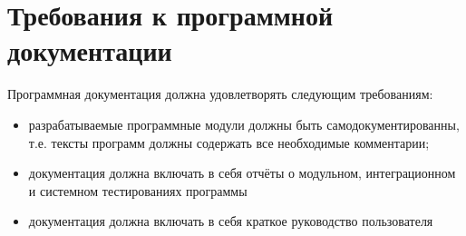 \documentclass[a4paper,12pt]{report}
\numberwithin{equation}{section}
\begin{document}
\section{Требования к программной документации}
Программная документация должна удовлетворять следующим требованиям:
\begin{itemize}
  \item разрабатываемые программные модули должны быть самодокументированны, т.е. тексты программ должны содержать все необходимые комментарии;
  \item документация должна включать в себя отчёты о модульном, интеграционном и системном тестированиях программы
  \item документация должна включать в себя краткое руководство пользователя
\end{itemize}
\end{document}
